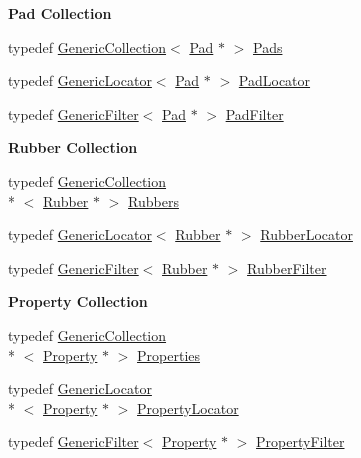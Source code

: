 \begin{Indent}{\bf Pad Collection}\par
\begin{DoxyCompactItemize}
\item 
typedef \hyperlink{classHurricane_1_1GenericCollection}{Generic\-Collection}$<$ \hyperlink{classHurricane_1_1Pad}{Pad} $\ast$ $>$ \hyperlink{namespaceHurricane_abd1f433c44d8b515e1b8a8810aea1610}{Pads}
\item 
typedef \hyperlink{classHurricane_1_1GenericLocator}{Generic\-Locator}$<$ \hyperlink{classHurricane_1_1Pad}{Pad} $\ast$ $>$ \hyperlink{namespaceHurricane_a733c2eb75cde14a8b6a2e62edfbd2792}{Pad\-Locator}
\item 
typedef \hyperlink{classHurricane_1_1GenericFilter}{Generic\-Filter}$<$ \hyperlink{classHurricane_1_1Pad}{Pad} $\ast$ $>$ \hyperlink{namespaceHurricane_aeff6d8148675fc30f366906bfc652c25}{Pad\-Filter}
\end{DoxyCompactItemize}
\end{Indent}
\begin{Indent}{\bf Rubber Collection}\par
\begin{DoxyCompactItemize}
\item 
typedef \hyperlink{classHurricane_1_1GenericCollection}{Generic\-Collection}\\*
$<$ \hyperlink{classHurricane_1_1Rubber}{Rubber} $\ast$ $>$ \hyperlink{namespaceHurricane_af8923abd57508cc44931a00d61b564ad}{Rubbers}
\item 
typedef \hyperlink{classHurricane_1_1GenericLocator}{Generic\-Locator}$<$ \hyperlink{classHurricane_1_1Rubber}{Rubber} $\ast$ $>$ \hyperlink{namespaceHurricane_ae4f27278e942109c3c47ad1b741f9df3}{Rubber\-Locator}
\item 
typedef \hyperlink{classHurricane_1_1GenericFilter}{Generic\-Filter}$<$ \hyperlink{classHurricane_1_1Rubber}{Rubber} $\ast$ $>$ \hyperlink{namespaceHurricane_ae331d428a7e324593e4a47dac023b7f0}{Rubber\-Filter}
\end{DoxyCompactItemize}
\end{Indent}
\begin{Indent}{\bf Property Collection}\par
\begin{DoxyCompactItemize}
\item 
typedef \hyperlink{classHurricane_1_1GenericCollection}{Generic\-Collection}\\*
$<$ \hyperlink{classHurricane_1_1Property}{Property} $\ast$ $>$ \hyperlink{namespaceHurricane_afd7bca6dad4be54b7c03b0463e6c0004}{Properties}
\item 
typedef \hyperlink{classHurricane_1_1GenericLocator}{Generic\-Locator}\\*
$<$ \hyperlink{classHurricane_1_1Property}{Property} $\ast$ $>$ \hyperlink{namespaceHurricane_a91d71616b5784225dfd4296487e49c07}{Property\-Locator}
\item 
typedef \hyperlink{classHurricane_1_1GenericFilter}{Generic\-Filter}$<$ \hyperlink{classHurricane_1_1Property}{Property} $\ast$ $>$ \hyperlink{namespaceHurricane_a9e98e66d188d506145a5e92045691777}{Property\-Filter}
\end{DoxyCompactItemize}
\end{Indent}
